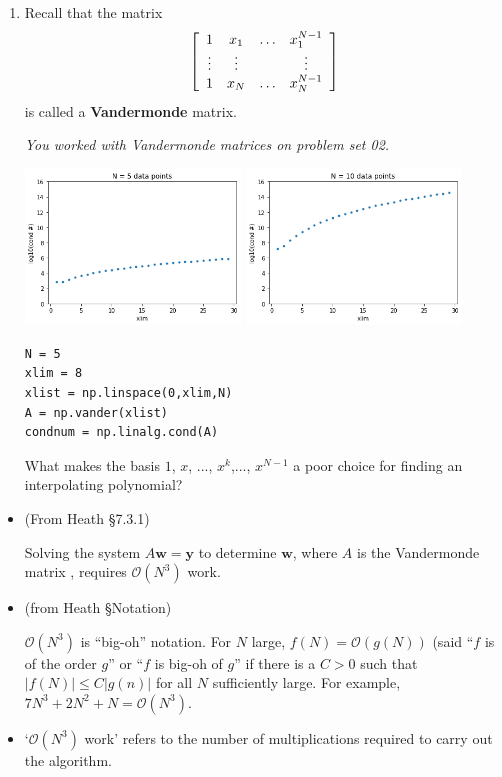\documentclass[12pt,letterpaper,noanswers]{exam}
\newcommand{\vc}[1]{\boldsymbol{#1}}
\begin{document}
\begin{enumerate}[resume=classQ]
\item Recall that the matrix \[\left[\begin{array}{c c c c}
1 & x_1 & \hdots & x_1^{N-1} \\
\vdots & \vdots & & \vdots \\
1 & x_N & \hdots & x_N^{N-1}
\end{array}\right]\] is called a \textbf{Vandermonde} matrix.  

\emph{You worked with Vandermonde matrices on problem set 02.} 

\includegraphics[width=0.45\textwidth]{img/Class08vandermonde5.png}
\includegraphics[width=0.45\textwidth]{img/Class08vandermonde10.png}

\begin{verbatim}
N = 5
xlim = 8
xlist = np.linspace(0,xlim,N)
A = np.vander(xlist)
condnum = np.linalg.cond(A)
\end{verbatim}

What makes the basis $1$, $x$, ..., $x^k$,..., $x^{N-1}$ a poor choice for finding an interpolating polynomial?
\vspace{1in}
\end{enumerate}

\begin{tcolorbox}
\begin{itemize}
\itemsep0pt
    \item (From Heath \S 7.3.1)
    
    Solving the system $A\vc{w} = \vc{y}$ to determine $\vc{w}$, where $A$ is the Vandermonde matrix , requires $\mathcal{O}(N^3)$ work.
    \item (from Heath \S Notation)
    
    $\mathcal{O}(N^3)$ is ``big-oh'' notation.  For $N$ large, $f(N) = \mathcal{O}(g(N))$ (said ``$f$ is of the order $g$'' or ``$f$ is big-oh of $g$'' if there is a $C>0$ such that $\vert f(N)\vert \leq C\vert g(n)\vert$ for all $N$ sufficiently large.  For example, $7N^3 + 2N^2 + N = \mathcal{O}(N^3)$.
    
    \item `$\mathcal{O}(N^3)$ work' refers to the number of multiplications required to carry out the algorithm.
\end{itemize}
\end{tcolorbox}
\end{document}
